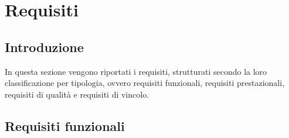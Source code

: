 \section{Requisiti}
\subsection{Introduzione}
In questa sezione vengono riportati i requisiti, strutturati secondo la loro classificazione per tipologia, ovvero requisiti funzionali, requisiti prestazionali, requisiti di qualità e requisiti di vincolo.
\newline 
\subsection{Requisiti funzionali}
\renewcommand{\arraystretch}{1.5}
